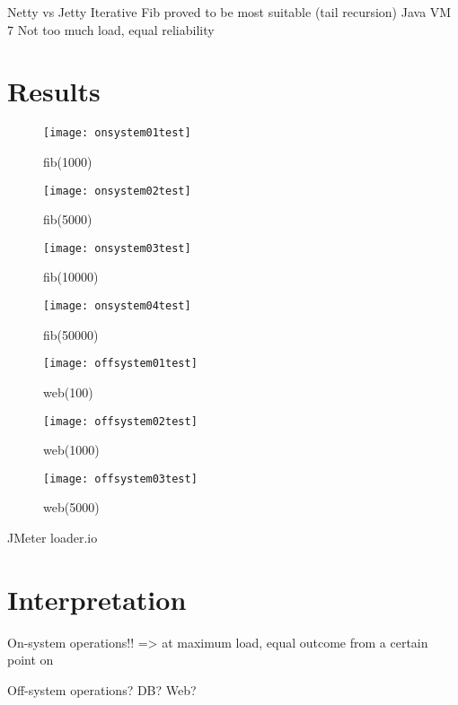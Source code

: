 Netty vs Jetty
Iterative Fib proved to be most suitable (tail recursion)
Java VM 7
Not too much load, equal reliability

\section{Results}

\begin{figure}
\centering\small
\setlength{\tabcolsep}{0mm}
  \texttt{[image: onsystem01test]}
\caption{fib(1000)
}
\label{fig:response_time} 
\end{figure}

\begin{figure}
\centering\small
\setlength{\tabcolsep}{0mm}
  \texttt{[image: onsystem02test]} 
\caption{fib(5000)
}
\label{fig:response_time} 
\end{figure}

\begin{figure}
\centering\small
\setlength{\tabcolsep}{0mm}
  \texttt{[image: onsystem03test]}
\caption{fib(10000)
}
\label{fig:response_time} 
\end{figure}

\begin{figure}
\centering\small
\setlength{\tabcolsep}{0mm}
  \texttt{[image: onsystem04test]}
\caption{fib(50000)
}
\label{fig:response_time} 
\end{figure}

\begin{figure}
\centering\small
\setlength{\tabcolsep}{0mm}
  \texttt{[image: offsystem01test]}
\caption{web(100)
}
\label{fig:response_time} 
\end{figure}

\begin{figure}
\centering\small
\setlength{\tabcolsep}{0mm}
  \texttt{[image: offsystem02test]}
\caption{web(1000)
}
\label{fig:response_time} 
\end{figure}

\begin{figure}
\centering\small
\setlength{\tabcolsep}{0mm}
  \texttt{[image: offsystem03test]}
\caption{web(5000)
}
\label{fig:response_time} 
\end{figure}

JMeter
loader.io

\section{Interpretation}
On-system operations!!
=> at maximum load, equal outcome from a certain point on

Off-system operations? DB? Web?